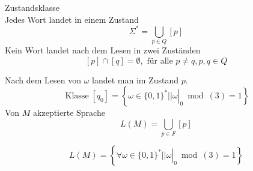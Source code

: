 \begin{definition}{Zustandsklasse}\\
    Jedes Wort landet in einem Zustand
    $$
    \Sigma^{*}=\bigcup_{p \in Q}[p]
    $$
    Kein Wort landet nach dem Lesen in zwei Zuständen
    $$
    [p] \cap[q]=\emptyset, \text { für alle } p \neq q, p, q \in Q
    $$
\end{definition}

\begin{example}
    Nach dem Lesen von $\omega$ landet man im Zustand $p$.
    $$
    \operatorname{Klasse}\left[q_{0}\right]=\left\{\left.\omega \in\{0,1\}^{*}|| \omega\right|_{0} \bmod (3)=1\right\}
    $$
    Von $M$ akzeptierte Sprache
    $$
    L(M)=\bigcup_{p \in F}[p]
    $$
\end{example}

\begin{example}
    $$
    L(M)=\left\{\left.\forall \omega \in\{0,1\}^{*}|| \omega\right|_{0} \bmod (3)=1\right\}
    $$
\end{example}
